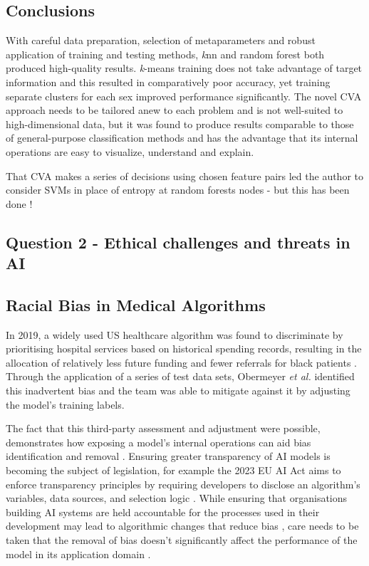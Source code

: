 \documentclass[a4paper, 11pt]{article}
\begin{document}
\vspace{\baselineskip}

\subsection*{Conclusions}

With careful data preparation, selection of metaparameters and robust application of training and testing methods, 
\textit{k}nn and random forest both produced high-quality results. 
\textit{k}-means training does not take advantage of target information and this resulted in comparatively poor accuracy, yet training
separate clusters for each sex improved performance significantly.
The novel CVA approach needs to be tailored anew to each problem and is not well-suited to high-dimensional data, 
but it was found to produce results comparable to those of general-purpose classification methods and has the advantage that 
its internal operations are easy to visualize, understand and explain.

That CVA makes a series of decisions using chosen feature pairs 
led the author to consider SVMs in place of entropy at random forests nodes - 
but this has been done \cite{law2003support}!

\begin{center}
\subsection*{Question 2 - Ethical challenges and threats in AI}
\end{center}

\subsection*{Racial Bias in Medical Algorithms}

In 2019, a widely used US healthcare algorithm was found to discriminate by prioritising hospital services 
based on historical spending records, resulting in the allocation of relatively less future funding and fewer referrals 
for black patients \cite{Jemielity2019, Ledford2019}. 
Through the application of a series of test data sets, Obermeyer \textit{et al.} \cite{Obermeyer2019} identified this inadvertent bias 
and the team was able to mitigate against it by adjusting the model’s training labels. 

The fact that this third-party assessment and adjustment were possible, demonstrates how exposing a model’s internal operations 
can aid bias identification and removal \cite{Seroussi2020, Winter2023}. 
Ensuring greater transparency of AI models is becoming the subject of legislation, 
for example the 2023 EU AI Act aims to enforce transparency principles by requiring developers to disclose an 
algorithm’s variables, data sources, and selection logic \cite{EuropeanParliament2023, Edwards2021}. 
While ensuring that organisations building AI systems are held accountable for the processes used in their development 
may lead to algorithmic changes that reduce bias \cite{Donovan2018, Lawry2020}, 
care needs to be taken that the removal of bias doesn't significantly affect the performance of the model 
in its application domain \cite{Kearns2020}.
\end{document}
